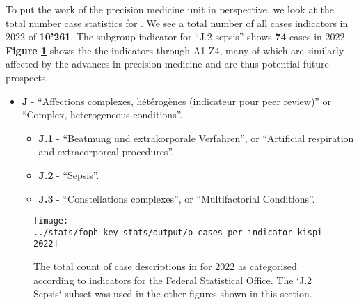 To put the work of the precision medicine unit in perspective, we look at the total number case statistics for \kispi.
We see a total number of all cases indicators in 2022 of \textbf{10'261}.
The subgroup indicator for ``J.2 sepsis'' shows \textbf{74} cases in 2022.
\textbf{Figure \ref{fig:p_cases_per_indicator_kispi_2022}}  shows the the indicators through A1-Z4, many of which are similarly affected by the advances in precision medicine and are thus potential future prospects.

\begin{itemize}
\item \textbf{J} - ``Affections complexes, hétérogènes (indicateur pour peer review)'' or ``Complex, heterogeneous conditions''.
\begin{itemize}
	\item  \textbf{J.1} - ``Beatmung und extrakorporale Verfahren'', or ``Artificial respiration and extracorporeal procedures''.
	\item  \textbf{J.2} - ``Sepsis''.
	\item  \textbf{J.3} - ``Constellations complexes'', or ``Multifactorial Conditions''.
\end{itemize}
\end{itemize}

\begin{figure}[h] \hspace*{0cm} 
\begin{center}
	\texttt{[image: ../stats/foph\_key\_stats/output/p\_cases\_per\_indicator\_kispi\_2022]}
	\caption{The total count of case descriptions in \kispi for 2022 as categorised according to indicators for the Federal Statistical Office. 
	The `J.2 Sepsis` subset was used in the other figures shown in this section.}
	\label{fig:p_cases_per_indicator_kispi_2022}
\end{center}
\end{figure}

\clearpage